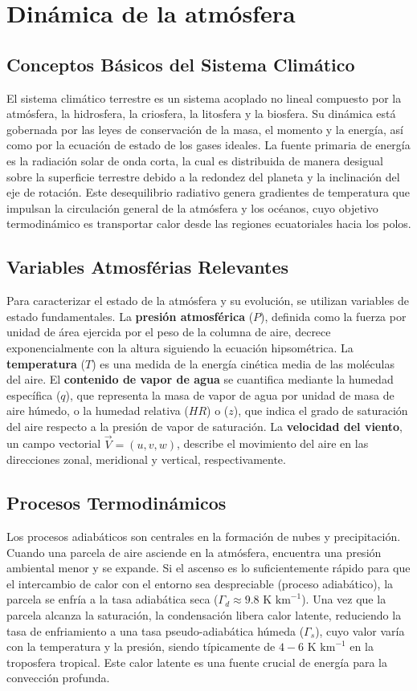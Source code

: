 \section{Dinámica de la atmósfera}

\subsection{Conceptos Básicos del Sistema Climático}
El sistema climático terrestre es un sistema acoplado no lineal compuesto por la atmósfera, la hidrosfera, la criosfera, la litosfera y la biosfera. Su dinámica está gobernada por las leyes de conservación de la masa, el momento y la energía, así como por la ecuación de estado de los gases ideales. La fuente primaria de energía es la radiación solar de onda corta, la cual es distribuida de manera desigual sobre la superficie terrestre debido a la redondez del planeta y la inclinación del eje de rotación. Este desequilibrio radiativo genera gradientes de temperatura que impulsan la circulación general de la atmósfera y los océanos, cuyo objetivo termodinámico es transportar calor desde las regiones ecuatoriales hacia los polos.

\subsection{Variables Atmosférias Relevantes}
Para caracterizar el estado de la atmósfera y su evolución, se utilizan variables de estado fundamentales. La \textbf{presión atmosférica} (\(P\)), definida como la fuerza por unidad de área ejercida por el peso de la columna de aire, decrece exponencialmente con la altura siguiendo la ecuación hipsométrica. La \textbf{temperatura} (\(T\)) es una medida de la energía cinética media de las moléculas del aire. El \textbf{contenido de vapor de agua} se cuantifica mediante la humedad específica (\(q\)), que representa la masa de vapor de agua por unidad de masa de aire húmedo, o la humedad relativa (\(HR\)) o (\(z\)), que indica el grado de saturación del aire respecto a la presión de vapor de saturación. La \textbf{velocidad del viento}, un campo vectorial \(\vec{V} = (u, v, w)\), describe el movimiento del aire en las direcciones zonal, meridional y vertical, respectivamente.

\subsection{Procesos Termodinámicos}
Los procesos adiabáticos son centrales en la formación de nubes y precipitación. Cuando una parcela de aire asciende en la atmósfera, encuentra una presión ambiental menor y se expande. Si el ascenso es lo suficientemente rápido para que el intercambio de calor con el entorno sea despreciable (proceso adiabático), la parcela se enfría a la tasa adiabática seca (\(\Gamma_d \approx 9.8 \text{ K km}^{-1}\)). Una vez que la parcela alcanza la saturación, la condensación libera calor latente, reduciendo la tasa de enfriamiento a una tasa pseudo-adiabática húmeda (\(\Gamma_s\)), cuyo valor varía con la temperatura y la presión, siendo típicamente de \(4-6 \text{ K km}^{-1}\) en la troposfera tropical. Este calor latente es una fuente crucial de energía para la convección profunda.

